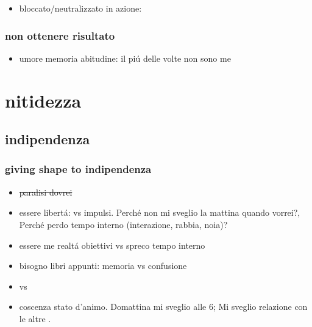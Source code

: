 \begin{itemize}

\item bloccato/neutralizzato in azione:

\end{itemize}

\subsection{non ottenere risultato}

\begin{itemize}

\item umore memoria abitudine: il pi\'u delle volte non sono me

\end{itemize}

{\let\clearpage\relax
\chapter{nitidezza}
}
\PartialToc


\section{indipendenza}

\subsection{giving shape to indipendenza}

\begin{itemize}

\item \sout{paralisi dovrei} 

\item essere libert\'a:  vs impulsi. Perch\'e non mi sveglio la mattina quando vorrei?, Perch\'e perdo tempo interno (interazione, rabbia, noia)?

\item essere me realt\'a obiettivi vs spreco tempo interno

\item bisogno libri appunti: memoria vs confusione

\item {} vs 

\item coscenza stato d'animo. Domattina mi sveglio alle 6; Mi sveglio  relazione con le altre .

\end{itemize}

